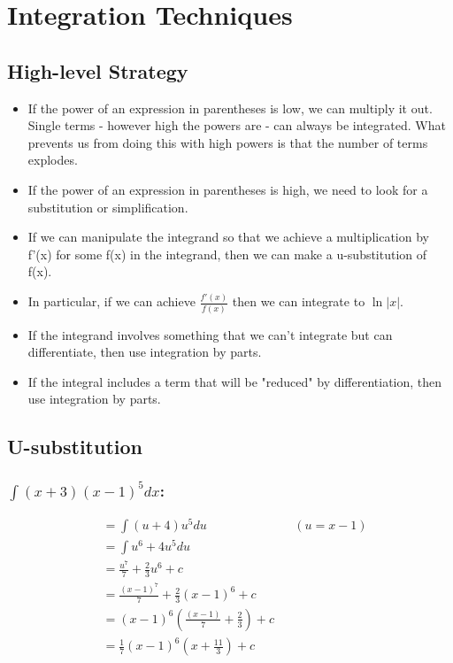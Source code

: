 \documentclass[MathsNotesBase.tex]{subfiles}
\date{\vspace{-6ex}}
\begin{document}
\chapter*{Integration Techniques}


\section*{High-level Strategy}
\begin{itemize}
  \item If the power of an expression in parentheses is low, we can multiply it out. Single terms - however high the powers are - can always be integrated. What prevents us from doing this with high powers is that the number of terms explodes.
  \item If the power of an expression in parentheses is high, we need to look for a substitution or simplification.
  \item If we can manipulate the integrand so that we achieve a multiplication by f'(x) for some f(x) in the integrand, then we can make a u-substitution of f(x).
  \item In particular, if we can achieve $\frac{f'(x)}{f(x)}$ then we can integrate to $\ln\rvert{x}\lvert$.
  \item If the integrand involves something that we can't integrate but can differentiate, then use integration by parts.
  \item If the integral includes a term that will be "reduced" by differentiation, then use integration by parts.
\end{itemize}



\section*{U-substitution}
\bigskip

  \subsection*{$\int{(x+3)(x - 1)^5}dx$:}
   
  \begin{align*}
      &= \int{(u+4)u^5}du && (u=x-1)\\
      &= \int{u^6+4u^5}du && \\[8pt]
      &= \frac{u^7}{7}+\frac{2}{3}u^6 + c && \\[8pt]
      &= \frac{(x-1)^7}{7} + \frac{2}{3}(x-1)^6 + c && \\[8pt]
      &= (x-1)^6\left(\frac{(x-1)}{7} + \frac{2}{3}\right) + c && \\[8pt]
      &= \frac{1}{7}(x-1)^6\left(x + \frac{11}{3}\right) + c
  \end{align*}
  
\end{document}
